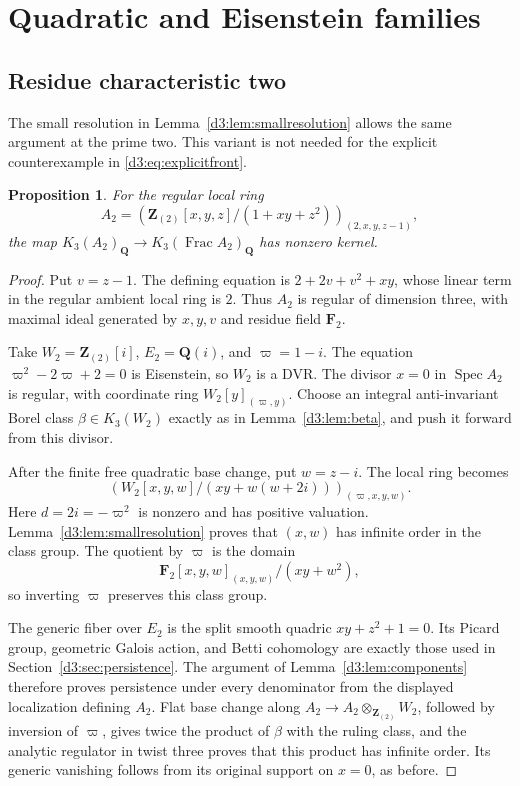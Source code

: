 \documentclass[11pt,a4paper]{amsart}
\numberwithin{equation}{section}
\newtheorem{proposition}[theorem]{Proposition}
\theoremstyle{definition}
\theoremstyle{remark}
\newcommand{\Q}{\mathbf Q}
\newcommand{\Z}{\mathbf Z}
\newcommand{\F}{\mathbf F}
\newcommand{\Spec}{\operatorname{Spec}}
\newcommand{\Frac}{\operatorname{Frac}}
\newcommand{\Qrat}{_{\Q}}
\begin{document}
\section{Quadratic and Eisenstein families}\label{d3:sec:families}

\subsection{Residue characteristic two}\label{d3:sec:two}

The small resolution in Lemma~\ref{d3:lem:smallresolution} allows the same argument at the prime two. This variant is not needed for the explicit counterexample in \eqref{d3:eq:explicitfront}.

\begin{proposition}\label{d3:prop:two}
For the regular local ring
\[
A_2=\left(\Z_{(2)}[x,y,z]/(1+xy+z^2)\right)_{(2,x,y,z-1)},
\]
the map $K_3(A_2)\Qrat\to K_3(\Frac A_2)\Qrat$ has nonzero kernel.
\end{proposition}
\begin{proof}
Put $v=z-1$. The defining equation is $2+2v+v^2+xy$, whose linear term in the regular ambient local ring is $2$. Thus $A_2$ is regular of dimension three, with maximal ideal generated by $x,y,v$ and residue field $\F_2$.

Take $W_2=\Z_{(2)}[i]$, $E_2=\Q(i)$, and $\varpi=1-i$. The equation $\varpi^2-2\varpi+2=0$ is Eisenstein, so $W_2$ is a DVR. The divisor $x=0$ in $\Spec A_2$ is regular, with coordinate ring $W_2[y]_{(\varpi,y)}$. Choose an integral anti-invariant Borel class $\beta\in K_3(W_2)$ exactly as in Lemma~\ref{d3:lem:beta}, and push it forward from this divisor.

After the finite free quadratic base change, put $w=z-i$. The local ring becomes
\[
\left(W_2[x,y,w]/(xy+w(w+2i))\right)_{(\varpi,x,y,w)}.
\]
Here $d=2i=-\varpi^2$ is nonzero and has positive valuation. Lemma~\ref{d3:lem:smallresolution} proves that $(x,w)$ has infinite order in the class group. The quotient by $\varpi$ is the domain
\[
\F_2[x,y,w]_{(x,y,w)}/(xy+w^2),
\]
so inverting $\varpi$ preserves this class group.

The generic fiber over $E_2$ is the split smooth quadric $xy+z^2+1=0$. Its Picard group, geometric Galois action, and Betti cohomology are exactly those used in Section~\ref{d3:sec:persistence}. The argument of Lemma~\ref{d3:lem:components} therefore proves persistence under every denominator from the displayed localization defining $A_2$. Flat base change along $A_2\to A_2\otimes_{\Z_{(2)}}W_2$, followed by inversion of $\varpi$, gives twice the product of $\beta$ with the ruling class, and the analytic regulator in twist three proves that this product has infinite order. Its generic vanishing follows from its original support on $x=0$, as before.
\end{proof}
\end{document}
